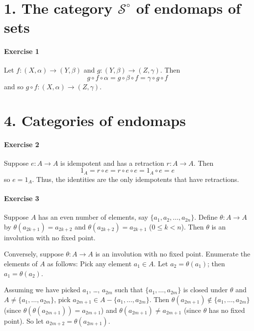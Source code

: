 \documentclass{report}
\begin{document}
    \section{1. The category $\mathcal{S}^\circ$ of endomaps of sets}

    \paragraph{Exercise 1}
    Let $f : (X, \alpha) \rightarrow (Y, \beta)$ and $g : (Y, \beta) \rightarrow (Z, \gamma)$. Then
    \[ g \circ f \circ \alpha = g \circ \beta \circ f = \gamma \circ g \circ f \]
    and so $g \circ f : (X, \alpha) \rightarrow (Z, \gamma)$.

    \section{4. Categories of endomaps}

    \paragraph{Exercise 2}
    Suppose $e : A \rightarrow A$ is idempotent and has a retraction $r : A \rightarrow A$. Then
    \[ 1_A = r \circ e = r \circ e \circ e = 1_A \circ e = e \]
    so $e = 1_A$. Thus, the identities are the only idempotents that have retractions.

    \paragraph{Exercise 3}
    Suppose $A$ has an even number of elements, say $\{ a_1, a_2, \ldots, a_{2n} \}$. Define $\theta : A
    \rightarrow A$ by $\theta(a_{2k+1}) = a_{2k+2}$ and $\theta(a_{2k+2}) = a_{2k+1}$ ($0 \leq k < n$). Then
    $\theta$ is an involution with no fixed point.

    Conversely, suppose $\theta : A \rightarrow A$ is an involution with no fixed point. Enumerate the elements
    of $A$ as follows: Pick any element $a_1 \in A$. Let $a_2 = \theta(a_1)$; then $a_1 = \theta(a_2)$.

    Assuming we have picked $a_1$, \ldots, $a_{2m}$ such that $\{ a_1, \ldots, a_{2m} \}$ is closed under
    $\theta$ and $A \neq \{ a_1, \ldots, a_{2m} \}$, pick $a_{2m+1} \in A - \{ a_1, \ldots, a_{2m} \}$.
    Then $\theta(a_{2m+1}) \notin \{ a_1, \ldots, a_{2m} \}$ (since $\theta(\theta(a_{2m+1})) = a_{2m+1}$)
    and $\theta(a_{2m+1}) \neq a_{2m+1}$ (since $\theta$ has no fixed point). So let
    $a_{2m+2} = \theta(a_{2m+1})$.
\end{document}
